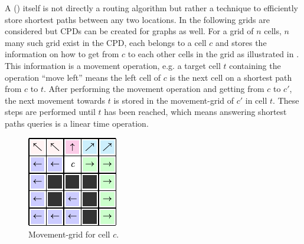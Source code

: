 			A  () itself is not directly a routing algorithm but rather a technique to efficiently store shortest paths between any two locations\cite{botea-cpd-2013}.
			In the following grids are considered but CPDs can be created for graphs as well.
			For a grid of $n$ cells, $n$ many such grid exist in the CPD, each belongs to a cell $c$ and stores the information on how to get from $c$ to each other cells in the grid as illustrated in .
			This information is a movement operation, e.g. a target cell $t$ containing the operation \enquote{move left} means the left cell of $c$ is the next cell on a shortest path from $c$ to $t$.
			After performing the movement operation and getting from $c$ to $c'$, the next movement towards $t$ is stored in the movement-grid of $c'$ in cell $t$.
			These steps are performed until $t$ has been reached, which means answering shortest paths queries is a linear time operation.
			
			\begin{figure}
				\vspace{-1.5\baselineskip}
				\includegraphics[width=\linewidth]{images/botea-cpd.pdf}
				\caption{Movement-grid for cell $c$\cite{botea-cpd-2013}.}
				\label{fig:cpd}
			\end{figure}
			
